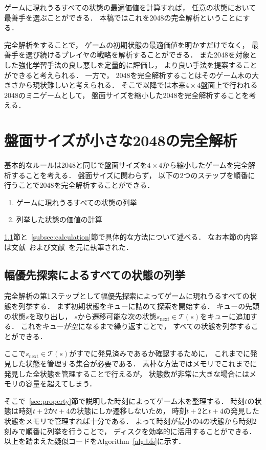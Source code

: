 ゲームに現れうるすべての状態の最適価値を計算すれば， 任意の状態において最善手を選ぶことができる．
本稿ではこれを2048の完全解析ということにする．

完全解析をすることで， ゲームの初期状態の最適価値を明かすだけでなく， 最善手を選び続けるプレイヤの戦略を解析することができる．
また2048を対象とした強化学習手法の良し悪しを定量的に評価し， より良い手法を提案することができると考えられる．
一方で， 2048を完全解析することはそのゲーム木の大きさから現状難しいと考えられる．
そこで以降では本来$4\times4$盤面上で行われる2048のミニゲームとして， 盤面サイズを縮小した2048を完全解析することを考える．

\section{盤面サイズが小さな2048の完全解析}
\label{sec:mini2048}
基本的なルールは2048と同じで盤面サイズを$4\times4$から縮小したゲームを完全解析することを考える．
盤面サイズに関わらず， 以下の$2$つのステップを順番に行うことで2048を完全解析することができる．

\begin{enumerate}
    \item ゲームに現れうるすべての状態の列挙
    \item 列挙した状態の価値の計算
\end{enumerate}

\ref{subsec:enumeration}節と~\ref{subsec:calculation}節で具体的な方法について述べる．
なお本節の内容は文献~\cite{3x3_2048}および文献~\cite{4x3_2048}を元に執筆された．

\subsection{幅優先探索によるすべての状態の列挙}
\label{subsec:enumeration}
完全解析の第1ステップとして幅優先探索によってゲームに現れうるすべての状態を列挙する．
まず初期状態をキューに詰めて探索を開始する．
キューの先頭の状態$s$を取り出し， $s$から遷移可能な次の状態$s_{\text{next}} \in \mathcal{T}(s)$をキューに追加する．
これをキューが空になるまで繰り返すことで， すべての状態を列挙することができる．

ここで$s_{\text{next}} \in \mathcal{T}(s)$がすでに発見済みであるか確認するために， これまでに発見した状態を管理する集合が必要である．
素朴な方法ではメモリでこれまでに発見した全状態を管理することで行えるが， 状態数が非常に大きな場合にはメモリの容量を超えてしまう．

そこで~\ref{sec:property}節で説明した時刻によってゲーム木を整理する．
時刻$t$の状態は時刻$t+2$か$t+4$の状態にしか遷移しないため， 時刻$t+2$と$t+4$の発見した状態をメモリで管理すれば十分である．
よって時刻が最小の$4$の状態から時刻$2$刻みで順番に列挙を行うことで， ディスクを効率的に活用することができる．
以上を踏まえた疑似コードをAlgorithm~\ref{alg:bfs}に示す．

